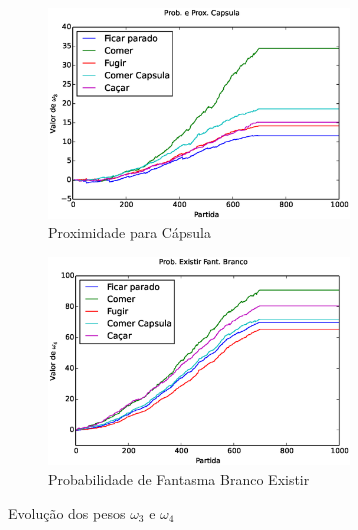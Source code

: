 \begin{figure}[H]
	\centering
	\begin{subfigure}[t]{.5\textwidth}
		\centering
		\includegraphics[width=80mm]{images/5_behaviors_original_map/weights____pol__DistCapsula}
		\caption{Proximidade para Cápsula}
		\label{img:5ComportamentosMapaOriginal:PesoDistCapsula}
	\end{subfigure}%
	\begin{subfigure}[t]{.5\textwidth}
		\centering
		\includegraphics[width=80mm]{images/5_behaviors_original_map/weights____pol__ProbExistirCapsula}
		\caption{Probabilidade de Fantasma Branco Existir}
		\label{img:5ComportamentosMapaOriginal:PesoProbFantasmaBrancoExistir}
	\end{subfigure}
	\caption{Evolução dos pesos $ \omega_3 $ e $ \omega_4 $}
	\label{img:5ComportamentosMapaOriginal:PesoDistCapsulaOuProbCapsulaExistir}
\end{figure}

